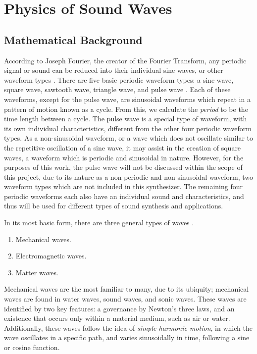 \chapter{Physics of Sound Waves}\label{chapter:theory}

\section{Mathematical Background}\label{section:waveforms}
According to Joseph Fourier, the creator of the Fourier Transform, any periodic signal or sound can be reduced into their individual sine waves, or other waveform types \cite{Broughton_Bryan_2008}. There are five basic periodic waveform types: a sine wave, square wave, sawtooth wave, triangle wave, and pulse wave \cite{Winer_2018}. Each of these waveforms, except for the pulse wave, are sinusoidal waveforms which repeat in a pattern of motion known as a cycle. From this, we calculate the \textit{period} to be the time length between a cycle. The pulse wave is a special type of waveform, with its own individual characteristics, different from the other four periodic waveform types. As a non-sinusoidal waveform, or a wave which does not oscillate similar to the repetitive oscillation of a sine wave, it may assist in the creation of square waves, a waveform which is periodic and sinusoidal in nature. However, for the purposes of this work, the pulse wave will not be discussed within the scope of this project, due to its nature as a non-periodic and non-sinusoidal waveform, two waveform types which are not included in this synthesizer. The remaining four periodic waveforms each also have an individual sound and characteristics, and thus will be used for different types of sound synthesis and applications.

In its most basic form, there are three general types of waves \cite{Halliday_Resnick_Walker_2005}.

\begin{enumerate}
	\item Mechanical waves.
	\item Electromagnetic waves.
	\item Matter waves.
\end{enumerate}

Mechanical waves are the most familiar to many, due to its ubiquity; mechanical waves are found in water waves, sound waves, and sonic waves. These waves are identified by two key features: a governance by Newton's three laws, and an existence that occurs only within a material medium, such as air or water. Additionally, these waves follow the idea of \textit{simple harmonic motion}, in which the wave oscillates in a specific path, and varies sinusoidally in time, following a sine or cosine function. 

